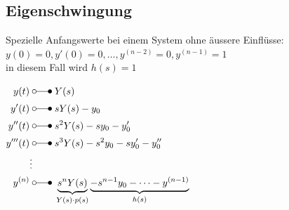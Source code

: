 				
		
	\subsection{Eigenschwingung }
		\begin{minipage}{12cm}
			Spezielle Anfangswerte bei einem System ohne äussere Einflüsse:\\
			$y(0) = 0, y'(0) = 0, \dots , y^{(n-2)} = 0, y^{(n-1)} = 1$\\
			in diesem Fall wird $h(s) = 1$\\
		\end{minipage}
		\begin{minipage}{6cm}
			\begin{math}
				\begin{aligned}
					y(t) \; &\laplace \; Y(s)\\
					y'(t) \; &\laplace \; sY(s) - y_0\\
					y''(t)\; &\laplace \; s^2Y(s) - sy_0 - y'_0\\ 
					y'''(t)\; &\laplace \; s^3Y(s) - s^2y_0 - sy'_0 - y''_0\\ 
					\vdots&\\
					y^{(n)} \; &\laplace \; 
					\underbrace{s^nY(s)}_{Y(s) \cdot p(s)}
					\underbrace{-s^{n-1}y_0 - \dots - y^{(n-1)}}_{h(s)}
				\end{aligned}
			\end{math}
		\end{minipage}